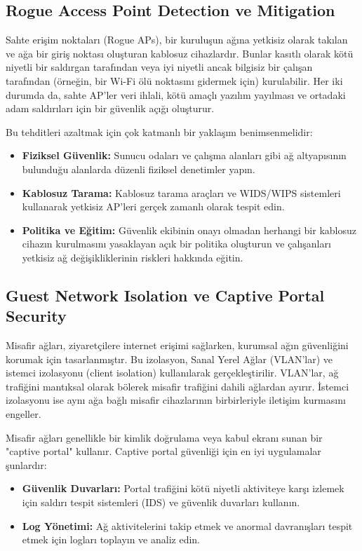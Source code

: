 \subsection{Rogue Access Point Detection ve Mitigation}

Sahte erişim noktaları (Rogue APs), bir kuruluşun ağına yetkisiz olarak takılan ve ağa bir giriş noktası oluşturan kablosuz cihazlardır. Bunlar kasıtlı olarak kötü niyetli bir saldırgan tarafından veya iyi niyetli ancak bilgisiz bir çalışan tarafından (örneğin, bir Wi-Fi ölü noktasını gidermek için) kurulabilir. Her iki durumda da, sahte AP'ler veri ihlali, kötü amaçlı yazılım yayılması ve ortadaki adam saldırıları için bir güvenlik açığı oluşturur.

Bu tehditleri azaltmak için çok katmanlı bir yaklaşım benimsenmelidir:

\begin{itemize}
\item \textbf{Fiziksel Güvenlik:} Sunucu odaları ve çalışma alanları gibi ağ altyapısının bulunduğu alanlarda düzenli fiziksel denetimler yapın.
\item \textbf{Kablosuz Tarama:} Kablosuz tarama araçları ve WIDS/WIPS sistemleri kullanarak yetkisiz AP'leri gerçek zamanlı olarak tespit edin.
\item \textbf{Politika ve Eğitim:} Güvenlik ekibinin onayı olmadan herhangi bir kablosuz cihazın kurulmasını yasaklayan açık bir politika oluşturun ve çalışanları yetkisiz ağ değişikliklerinin riskleri hakkında eğitin.
\end{itemize}

\subsection{Guest Network Isolation ve Captive Portal Security}

Misafir ağları, ziyaretçilere internet erişimi sağlarken, kurumsal ağın güvenliğini korumak için tasarlanmıştır. Bu izolasyon, Sanal Yerel Ağlar (VLAN'lar) ve istemci izolasyonu (client isolation) kullanılarak gerçekleştirilir. VLAN'lar, ağ trafiğini mantıksal olarak bölerek misafir trafiğini dahili ağlardan ayırır. İstemci izolasyonu ise aynı ağa bağlı misafir cihazlarının birbirleriyle iletişim kurmasını engeller.

Misafir ağları genellikle bir kimlik doğrulama veya kabul ekranı sunan bir "captive portal" kullanır. Captive portal güvenliği için en iyi uygulamalar şunlardır:

\begin{itemize}
\item \textbf{Güvenlik Duvarları:} Portal trafiğini kötü niyetli aktiviteye karşı izlemek için saldırı tespit sistemleri (IDS) ve güvenlik duvarları kullanın.
\item \textbf{Log Yönetimi:} Ağ aktivitelerini takip etmek ve anormal davranışları tespit etmek için logları toplayın ve analiz edin.
\end{itemize}


